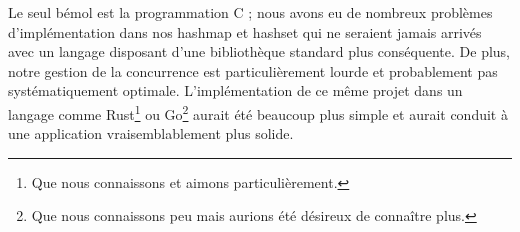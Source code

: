 \documentclass[a4paper,10pt]{article} %
\begin{document}
Le seul bémol est la programmation C ; nous avons eu de nombreux problèmes d'implémentation dans nos hashmap et hashset qui ne seraient jamais arrivés avec un langage disposant d'une bibliothèque standard plus conséquente. De plus, notre gestion de la concurrence est particulièrement lourde et probablement pas systématiquement optimale. L'implémentation de ce même projet dans un langage comme \textrm{Rust}\footnote{Que nous connaissons et aimons particulièrement.} ou \textrm{Go}\footnote{Que nous connaissons peu mais aurions été désireux de connaître plus.} aurait été beaucoup plus simple et aurait conduit à une application vraisemblablement plus solide.
\end{document}
